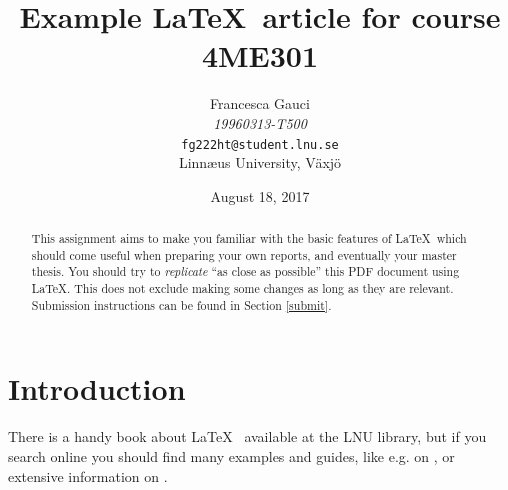 \documentclass[10pt]{article}
\begin{document}
\title{Example \LaTeX \ article for course 4ME301}
\author{Francesca Gauci \\ \textit{19960313-T500} \\ \texttt {fg222ht@student.lnu.se} \\ Linnæus University, Växjö}
\date{August 18, 2017}

\maketitle

\begin{abstract} {This assignment aims to make you familiar with the basic features
	of \LaTeX~which should come useful when preparing your own reports,
	and eventually your master thesis. You should try to \textit{replicate} “as
	close as possible” this PDF document using \LaTeX. This does not
	exclude making some changes as long as they are relevant. Submission
	instructions can be found in Section \ref{submit}}.
\end{abstract}

\section{Introduction}\label{intro}
\par{There is a handy book about \LaTeX~\cite{lamport} available at the LNU library, but if you search online you should find many examples and guides, like e.g. \cite{lees-miller} on \cite{lees-miller-hammersley}, or extensive information on \cite{latexproject}.}
\end{document}
